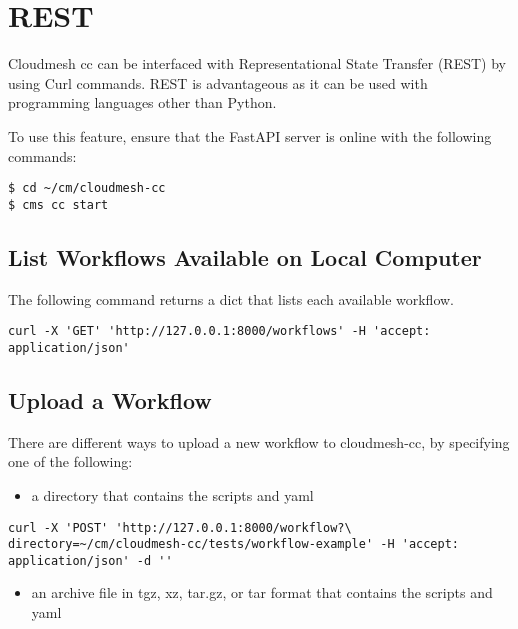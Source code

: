 
\section{REST}\label{rest}

Cloudmesh cc can be interfaced with Representational State Transfer
(REST) by using Curl commands. REST is advantageous as it can be used
with programming languages other than Python.

To use this feature, ensure that the FastAPI server is online with the
following commands:

\begin{verbatim}
$ cd ~/cm/cloudmesh-cc
$ cms cc start
\end{verbatim}

\subsection{List Workflows Available on Local
Computer}\label{list-workflows-available-on-local-computer}

The following command returns a dict that lists each available workflow.

\begin{verbatim}
curl -X 'GET' 'http://127.0.0.1:8000/workflows' -H 'accept: application/json'
\end{verbatim}

\subsection{Upload a Workflow}\label{upload-a-workflow}

There are different ways to upload a new workflow to cloudmesh-cc, by
specifying one of the following:

\smallskip
\begin{itemize}
\item
  a directory that contains the scripts and yaml
\end{itemize}

\begin{verbatim}
curl -X 'POST' 'http://127.0.0.1:8000/workflow?\
directory=~/cm/cloudmesh-cc/tests/workflow-example' -H 'accept: application/json' -d ''
\end{verbatim}
\smallskip

\smallskip
\begin{itemize}
\item
  an archive file in tgz, xz, tar.gz, or tar format that contains the
  scripts and yaml
\end{itemize}

